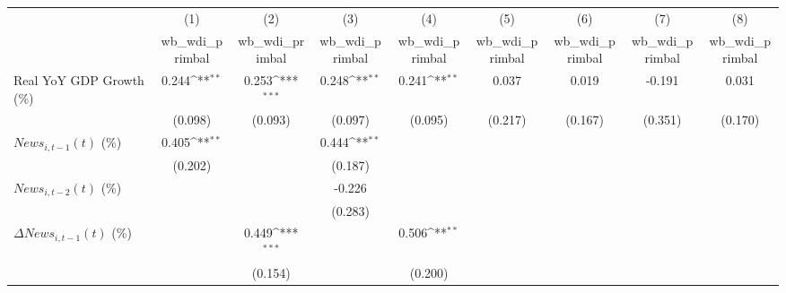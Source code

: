 {
\def\sym#1{\ifmmode^{#1}\else\(^{#1}\)\fi}
\begin{tabular}{l*{8}{c}}
\toprule
                    &\multicolumn{1}{c}{(1)}&\multicolumn{1}{c}{(2)}&\multicolumn{1}{c}{(3)}&\multicolumn{1}{c}{(4)}&\multicolumn{1}{c}{(5)}&\multicolumn{1}{c}{(6)}&\multicolumn{1}{c}{(7)}&\multicolumn{1}{c}{(8)}\\
                    &\multicolumn{1}{c}{wb_wdi_primbal}&\multicolumn{1}{c}{wb_wdi_primbal}&\multicolumn{1}{c}{wb_wdi_primbal}&\multicolumn{1}{c}{wb_wdi_primbal}&\multicolumn{1}{c}{wb_wdi_primbal}&\multicolumn{1}{c}{wb_wdi_primbal}&\multicolumn{1}{c}{wb_wdi_primbal}&\multicolumn{1}{c}{wb_wdi_primbal}\\
\midrule
Real YoY GDP Growth (\%)&       0.244\sym{**} &       0.253\sym{***}&       0.248\sym{**} &       0.241\sym{**} &       0.037         &       0.019         &      -0.191         &       0.031         \\
                    &     (0.098)         &     (0.093)         &     (0.097)         &     (0.095)         &     (0.217)         &     (0.167)         &     (0.351)         &     (0.170)         \\
\addlinespace
$ News_{i,t-1}(t)$ (\%)&       0.405\sym{**} &                     &       0.444\sym{**} &                     &                     &                     &                     &                     \\
                    &     (0.202)         &                     &     (0.187)         &                     &                     &                     &                     &                     \\
\addlinespace
$ News_{i,t-2}(t)$ (\%)&                     &                     &      -0.226         &                     &                     &                     &                     &                     \\
                    &                     &                     &     (0.283)         &                     &                     &                     &                     &                     \\
\addlinespace
$ \Delta News_{i,t-1}(t)$ (\%)&                     &       0.449\sym{***}&                     &       0.506\sym{**} &                     &                     &                     &                     \\
                    &                     &     (0.154)         &                     &     (0.200)         &                     &                     &                     &                     \\

\end{tabular}}
